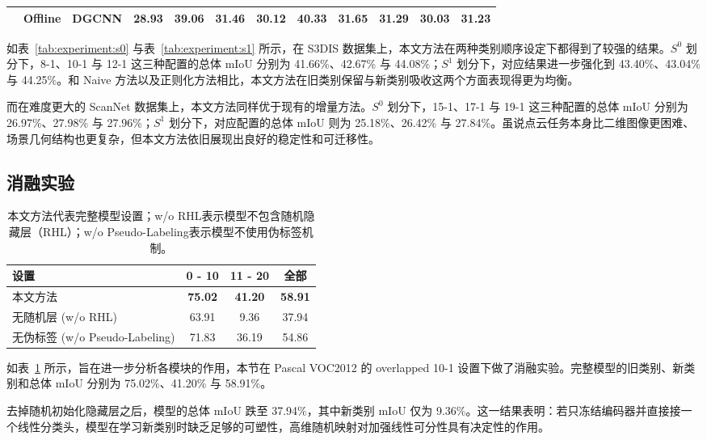 \begin{table}[!htbp]
\begin{tabular}{ll| c| ccc| ccc| ccc}
            & Offline & DGCNN     & 28.93 & 39.06 & 31.46 & 30.12 & 40.33 & 31.65 & 31.29 & 30.03 & 31.23 \\
            \bottomrule[1pt]
    \end{tabular}
\end{table}

如表~\ref{tab:experiment:s0} 与表~\ref{tab:experiment:s1} 所示，在 S3DIS 数据集上，本文方法在两种类别顺序设定下都得到了较强的结果。$S^0$ 划分下，8-1、10-1 与 12-1 这三种配置的总体 mIoU 分别为 41.66\%、42.67\% 与 44.08\%；$S^1$ 划分下，对应结果进一步强化到 43.40\%、43.04\% 与 44.25\%。和 Naive 方法以及正则化方法相比，本文方法在旧类别保留与新类别吸收这两个方面表现得更为均衡。

而在难度更大的 ScanNet 数据集上，本文方法同样优于现有的增量方法。$S^0$ 划分下，15-1、17-1 与 19-1 这三种配置的总体 mIoU 分别为 26.97\%、27.98\% 与 27.96\%；$S^1$ 划分下，对应配置的总体 mIoU 则为 25.18\%、26.42\% 与 27.84\%。虽说点云任务本身比二维图像更困难、场景几何结构也更复杂，但本文方法依旧展现出良好的稳定性和可迁移性。

\subsection{消融实验}

\begin{table}[!htbp]
    \centering
    \caption{本文方法代表完整模型设置；w/o RHL表示模型不包含随机隐藏层（RHL）；w/o Pseudo-Labeling表示模型不使用伪标签机制。}
    \begin{tabular}{lccc}
        \toprule
        设置 & 0 - 10 & 11 - 20 & 全部 \\
        \midrule
        本文方法 & \textbf{75.02} & \textbf{41.20} & \textbf{58.91} \\
        无随机层 (w/o RHL) & 63.91 & 9.36 &  37.94 \\
        无伪标签 (w/o Pseudo-Labeling) & 71.83 & 36.19 & 54.86 \\
        \bottomrule
    \end{tabular}
    \label{tab:ablation}
\end{table}

如表~\ref{tab:ablation} 所示，旨在进一步分析各模块的作用，本节在 Pascal VOC2012 的 overlapped 10-1 设置下做了消融实验。完整模型的旧类别、新类别和总体 mIoU 分别为 75.02\%、41.20\% 与 58.91\%。

去掉随机初始化隐藏层之后，模型的总体 mIoU 跌至 37.94\%，其中新类别 mIoU 仅为 9.36\%。这一结果表明：若只冻结编码器并直接接一个线性分类头，模型在学习新类别时缺乏足够的可塑性，高维随机映射对加强线性可分性具有决定性的作用。

